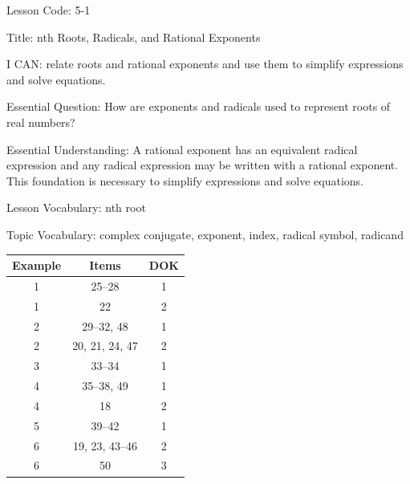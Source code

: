 \documentclass{article}
\newenvironment{lesson-meta}{}{}        %
\newenvironment{item-analysis}{}{}      %
\begin{document}
\begin{lesson-meta}
Lesson Code: 5-1

Title: nth Roots, Radicals, and Rational Exponents

I CAN: relate roots and rational exponents and use them to simplify expressions and solve equations.

Essential Question: How are exponents and radicals used to represent roots of real numbers?

Essential Understanding: A rational exponent has an equivalent radical expression and any radical expression may be written with a rational exponent. This foundation is necessary to simplify expressions and solve equations.

Lesson Vocabulary: nth root

Topic Vocabulary: complex conjugate, exponent, index, radical symbol, radicand
\end{lesson-meta}

\begin{item-analysis}
\begin{tabular}{ccc}
\toprule
Example & Items & DOK \\
\midrule
1 & 25--28 & 1 \\
1 & 22 & 2 \\
2 & 29--32, 48 & 1 \\
2 & 20, 21, 24, 47 & 2 \\
3 & 33--34 & 1 \\
4 & 35--38, 49 & 1 \\
4 & 18 & 2 \\
5 & 39--42 & 1 \\
6 & 19, 23, 43--46 & 2 \\
6 & 50 & 3 \\
\bottomrule
\end{tabular}
\end{item-analysis}
\end{document}
